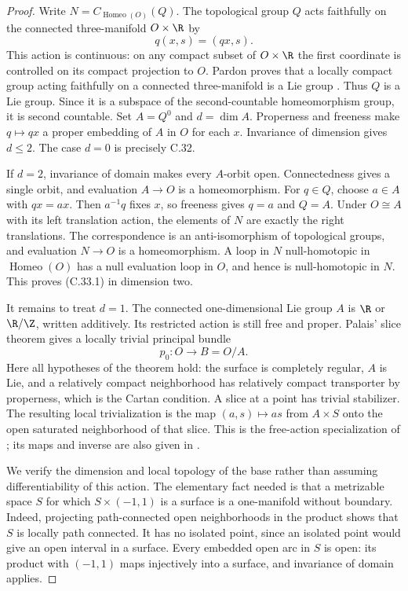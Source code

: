 \begin{proof}
Write $N=C_{\operatorname{Homeo}(O)}(Q)$.
The topological group $Q$ acts faithfully on the connected
three-manifold $O\times\R$ by
\[
                         q(x,s)=(qx,s).
                                                        \tag{C.33.2}
\]
This action is continuous: on any compact subset of $O\times\R$
the first coordinate is controlled on its compact projection to
$O$. Pardon proves that a locally compact group acting faithfully
on a connected three-manifold is a Lie group
\cite[Theorem~1.5 and the reduction preceding it]{C_Pardon2013}.
Thus $Q$ is a Lie group. Since it is a subspace of the
second-countable homeomorphism group, it is second countable.
Set $A=Q^0$ and $d=\dim A$.
Properness and freeness make $q\mapsto qx$ a proper embedding of
$A$ in $O$ for each $x$. Invariance of dimension gives $d\leq2$.
The case $d=0$ is precisely C.32.

If $d=2$, invariance of domain makes every $A$-orbit open.
Connectedness gives a single orbit, and evaluation $A\to O$
is a homeomorphism. For $q\in Q$, choose $a\in A$ with $qx=ax$.
Then $a^{-1}q$ fixes $x$, so freeness gives $q=a$ and $Q=A$.
Under $O\cong A$ with its left translation action, the elements of
$N$ are exactly the right translations. The correspondence
is an anti-isomorphism of topological groups, and evaluation
$N\to O$ is a homeomorphism. A loop in $N$ null-homotopic
in $\operatorname{Homeo}(O)$ has a null evaluation loop in $O$,
and hence is null-homotopic in $N$. This proves (C.33.1) in
dimension two.

It remains to treat $d=1$. The connected one-dimensional Lie
group $A$ is $\R$ or $\R/\Z$, written additively.
Its restricted action is still free and proper.
Palais' slice theorem gives a locally trivial principal bundle
\[
                 p_0:O\longrightarrow B=O/A.
                                                        \tag{C.33.3}
\]
Here all hypotheses of the theorem hold: the surface is completely
regular, $A$ is Lie, and a relatively compact neighborhood has
relatively compact transporter by properness, which is the
Cartan condition. A slice at a point has trivial stabilizer.
The resulting local trivialization is the map
$(a,s)\mapsto as$ from $A\times S$ onto the open saturated
neighborhood of that slice. This is the free-action specialization
of \cite[Theorem~2.3.3]{C_Palais1961}; its maps and inverse are
also given in \cite[Theorem~3.7]{C_KramerMuratGarcia2026}.

We verify the dimension and local topology of the base rather
than assuming differentiability of this action. The elementary
fact needed is that a metrizable space $S$ for which
$S\times(-1,1)$ is a surface is a one-manifold without boundary.
Indeed, projecting path-connected open neighborhoods in the
product shows that $S$ is locally path connected. It has no
isolated point, since an isolated point would give an open
interval in a surface. Every embedded open arc in $S$ is open:
its product with $(-1,1)$ maps injectively into a surface, and
invariance of domain applies.


\end{proof}
